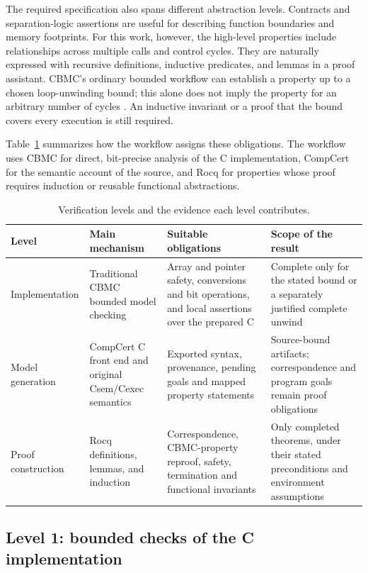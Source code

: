 \documentclass[manuscript, screen, review]{acmart}
\begin{document}
The required specification also spans different abstraction levels.
Contracts and separation-logic assertions are useful for describing
function boundaries and memory footprints. For this work, however, the
high-level properties include relationships across multiple calls and
control cycles. They are naturally expressed with recursive definitions,
inductive predicates, and lemmas in a proof assistant. CBMC's ordinary
bounded workflow can establish a property up to a chosen loop-unwinding
bound; this alone does not imply the property for an arbitrary number of
cycles \cite{KroeningTautschnig2014}. An inductive invariant or a proof that
the bound covers every execution is still required.

Table~\ref{tab:verification-levels} summarizes how the workflow assigns
these obligations. The workflow uses CBMC for direct, bit-precise analysis of
the C implementation, CompCert for the semantic account of the source, and
Rocq for properties whose proof requires induction or reusable functional
abstractions.

\begin{table}[t]
\caption{Verification levels and the evidence each level contributes.}
\label{tab:verification-levels}
\centering
\begin{tabular}{@{}p{}p{}p{}p{}@{}}
\hline
Level & Main mechanism & Suitable obligations & Scope of the result \\
\hline
Implementation & Traditional CBMC bounded model checking & Array and pointer safety, conversions and bit operations, and local assertions over the prepared C & Complete only for the stated bound or a separately justified complete unwind \\
Model generation & CompCert C front end and original Csem/Cexec semantics & Exported syntax, provenance, pending goals and mapped property statements & Source-bound artifacts; correspondence and program goals remain proof obligations \\
Proof construction & Rocq definitions, lemmas, and induction & Correspondence, CBMC-property reproof, safety, termination and functional invariants & Only completed theorems, under their stated preconditions and environment assumptions \\
\hline
\end{tabular}
\end{table}

\subsection{Level 1: bounded checks of the C implementation}
\end{document}
